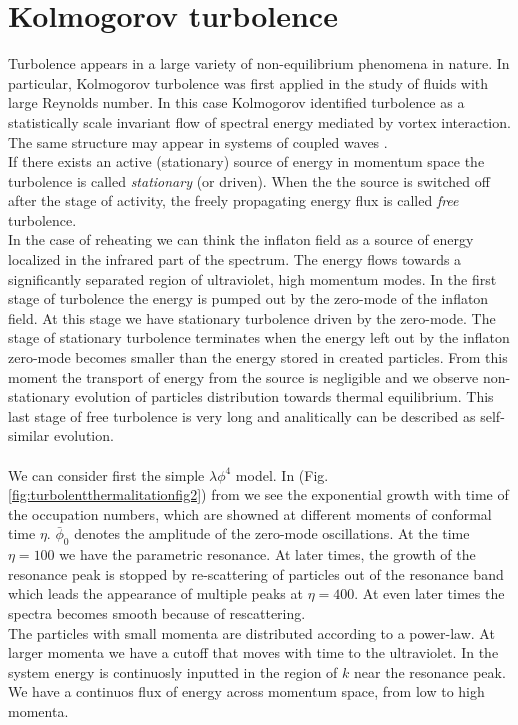 \documentclass[11pt,a4paper,twoside]{book}
\begin{document}
\section{Kolmogorov turbolence}
Turbolence appears in a large variety of non-equilibrium phenomena in nature. In particular, Kolmogorov turbolence was first applied in the study of fluids with large Reynolds number. In this case Kolmogorov identified turbolence as a statistically scale invariant flow of spectral energy mediated by vortex interaction. The same structure may appear in systems of coupled waves \cite{Chap6:turbolence}.\\
If there exists an active (stationary) source of energy in momentum space the turbolence is called \textit{stationary} (or driven). When the the source is switched off after the stage of activity, the freely propagating energy flux is called \textit{free} turbolence.\\
In the case of reheating we can think the inflaton field as a source of energy localized in the infrared part of the spectrum. The energy flows towards a significantly separated region of ultraviolet, high momentum modes. In the first stage of turbolence the energy is pumped out by the zero-mode of the inflaton field. At this stage we have stationary turbolence driven by the zero-mode. The stage of stationary turbolence terminates when the energy left out by the inflaton zero-mode becomes smaller than the energy stored in created particles. From this moment the transport of energy from the source is negligible and we observe non-stationary evolution of particles distribution towards thermal equilibrium. This last stage of free turbolence is very long and analitically can be described as self-similar evolution.\\
\\
We can consider first the simple $ \lambda \phi^{4} $ model. In  (Fig. \ref{fig:turbolentthermalitationfig2}) from \cite{Chap6:TurbolentThermalitation} we see the exponential growth with time of the occupation numbers, which are showned at different moments of conformal time $\eta$.  $\bar{\phi}_{0}$ denotes the amplitude of the zero-mode oscillations. At the time $\eta = 100$ we have the parametric resonance. At later times, the growth of the resonance peak is stopped by re-scattering of particles out of the resonance band which leads the appearance of multiple peaks at $ \eta=400 $. At even later times the spectra becomes smooth because of rescattering.\\
The particles with small momenta are distributed according to a power-law. At larger momenta  we have a cutoff that moves with time to the ultraviolet. In the system energy is continuosly inputted in the region of $ k $ near the resonance peak. We have a continuos flux of energy across momentum space, from low to high momenta.\\
\end{document}
